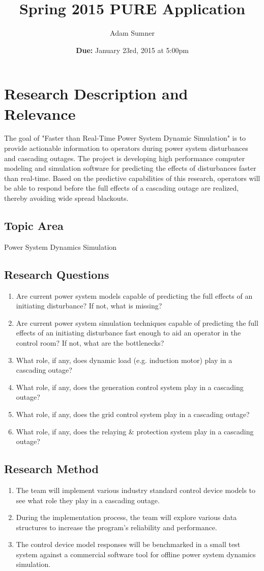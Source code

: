 \documentclass[]{article}
\title{Spring 2015 PURE Application}
\author{Adam Sumner}
\date{\textbf{Due:} January 23rd, 2015 at 5:00pm}
\begin{document}
\maketitle


\section{Research Description and Relevance}
The goal of "Faster than Real-Time Power System Dynamic Simulation" is to provide actionable information to operators during power system disturbances and cascading outages. The project is developing high performance computer modeling and simulation software for predicting the effects of disturbances faster than real-time. Based on the predictive capabilities of this research, operators will be able to respond before the full effects of a cascading outage are realized, thereby avoiding wide spread blackouts.
\subsection{Topic Area}
Power System Dynamics Simulation
\subsection{Research Questions}
\begin{enumerate}
	\item Are current power system models capable of predicting the full effects of an initiating disturbance? If not, what is missing?
	\item Are current power system simulation techniques capable of predicting the full effects of an initiating disturbance fast enough to aid an operator in the control room? If not, what are the bottlenecks?
	\item What role, if any, does dynamic load (e.g. induction motor) play in a cascading outage?
	\item What role, if any, does the generation control system play in a cascading outage?
	\item What role, if any, does the grid control system play in a cascading outage?
	\item What role, if any, does the relaying \& protection system play in a cascading outage?
\end{enumerate}
\subsection{Research Method}
\begin{enumerate}
	\item The team will implement various industry standard control device models to see what role they play in a cascading outage.
	\item During the implementation process, the team will explore various data structures to increase the program's reliability and performance.
	\item The control device model responses will be benchmarked in a small test system against a commercial software tool for offline power system dynamics simulation.  
\end{enumerate}
\end{document}
